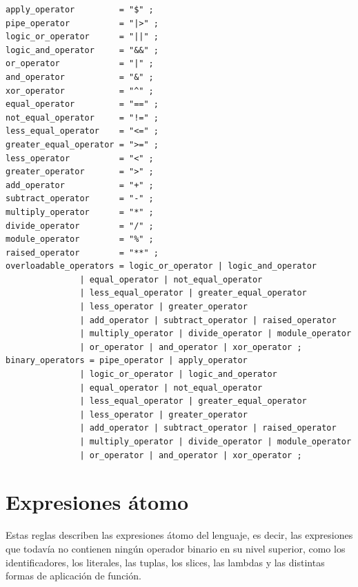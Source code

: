 \begin{lstlisting}[language={}, caption=Reglas de operadores]
apply_operator         = "$" ;
pipe_operator          = "|>" ;
logic_or_operator      = "||" ;
logic_and_operator     = "&&" ;
or_operator            = "|" ;
and_operator           = "&" ;
xor_operator           = "^" ;
equal_operator         = "==" ;
not_equal_operator     = "!=" ;
less_equal_operator    = "<=" ;
greater_equal_operator = ">=" ;
less_operator          = "<" ;
greater_operator       = ">" ;
add_operator           = "+" ;
subtract_operator      = "-" ;
multiply_operator      = "*" ;
divide_operator        = "/" ;
module_operator        = "%" ;
raised_operator        = "**" ;
overloadable_operators = logic_or_operator | logic_and_operator
               | equal_operator | not_equal_operator
               | less_equal_operator | greater_equal_operator
               | less_operator | greater_operator
               | add_operator | subtract_operator | raised_operator
               | multiply_operator | divide_operator | module_operator
               | or_operator | and_operator | xor_operator ;
binary_operators = pipe_operator | apply_operator
               | logic_or_operator | logic_and_operator
               | equal_operator | not_equal_operator
               | less_equal_operator | greater_equal_operator
               | less_operator | greater_operator
               | add_operator | subtract_operator | raised_operator
               | multiply_operator | divide_operator | module_operator
               | or_operator | and_operator | xor_operator ;
\end{lstlisting}

\section{Expresiones átomo}
\label{sec:ebnf-atomos}

Estas reglas describen las expresiones átomo del lenguaje, es decir, las expresiones que todavía no contienen ningún operador binario en su nivel superior, como los identificadores, los literales, las tuplas, los slices, las lambdas y las distintas formas de aplicación de función.

